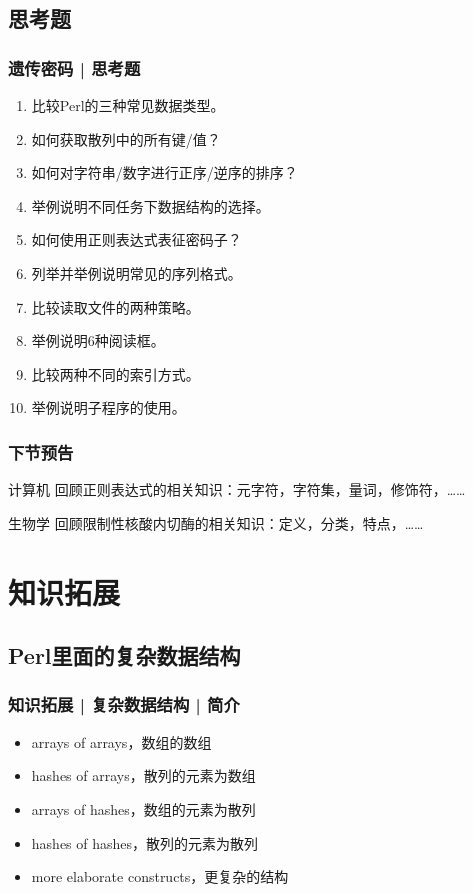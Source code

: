 \subsection{思考题}
\begin{frame}
  \frametitle{遗传密码 | 思考题}
  \begin{enumerate}
    \item 比较Perl的三种常见数据类型。
    \item 如何获取散列中的所有键/值？
    \item 如何对字符串/数字进行正序/逆序的排序？
    \item 举例说明不同任务下数据结构的选择。
    \item 如何使用正则表达式表征密码子？
    \item 列举并举例说明常见的序列格式。
    \item 比较读取文件的两种策略。
    \item 举例说明6种阅读框。
    \item 比较两种不同的索引方式。
    \item 举例说明子程序的使用。
  \end{enumerate}
\end{frame}

\begin{frame}
  \frametitle{下节预告}
  \begin{block}{计算机}
    回顾正则表达式的相关知识：元字符，字符集，量词，修饰符，……
  \end{block}
  \begin{block}{生物学}
    回顾限制性核酸内切酶的相关知识：定义，分类，特点，……
  \end{block}
\end{frame}

\section{知识拓展}
\subsection{Perl里面的复杂数据结构}
\begin{frame}
  \frametitle{知识拓展 | 复杂数据结构 | 简介}
  \begin{itemize}
    \item arrays of arrays，数组的数组
    \item hashes of arrays，散列的元素为数组
    \item arrays of hashes，数组的元素为散列
    \item hashes of hashes，散列的元素为散列
    \item more elaborate constructs，更复杂的结构
  \end{itemize}
\end{frame}

